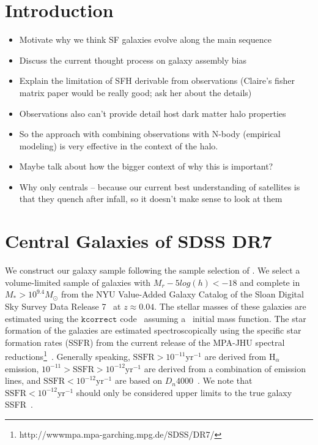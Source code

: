 \documentclass[12pt, letterpaper, preprint]{aastex}
\newcommand{\bitem}{\begin{itemize}}
\newcommand{\eitem}{\end{itemize}}
\begin{document}
\section{Introduction}
\bitem 
\item Motivate why we think SF galaxies evolve along the main sequence  
\item Discuss the current thought process on galaxy assembly bias 
\item Explain the limitation of SFH derivable from observations (Claire's fisher matrix paper would be really good; ask her about the details) 
\item Observations also can't provide detail host dark matter halo properties
\item So the approach with combining observations with N-body (empirical modeling) is very effective in the context of the halo.
\item Maybe talk about how the bigger context of why this is important?  
\item Why only centrals -- because our current best understanding of satellites is that they quench after infall, so it doesn't make sense to look at them
\eitem 

\section{Central Galaxies of SDSS DR7}
We construct our galaxy sample following the sample selection of \cite{tinker2011}. 
We select a volume-limited sample of galaxies with $M_r −5 log(h) < −18$ and complete in
$M_* > 10^{9.4} M_\odot$ from the NYU Value-Added Galaxy Catalog \citep[VAGC;][]{blanton2005}
of the Sloan Digital Sky Survey Data Release 7~\citep[SDSS DR7;][]{abazajian2009} at 
$z \approx 0.04$. The stellar masses of these galaxies are estimated using the
$\mathtt{kcorrect}$ code~\citep{blanton2007} assuming a~\cite{chabrier2003} initial
mass function. The star formation of the galaxies are estimated spectroscopically using the
specific star formation rates (SSFR) from the current release of the MPA-JHU spectral 
reductions\footnote{http://wwwmpa.mpa-garching.mpg.de/SDSS/DR7/}~\citep{brinchmann2004}.
Generally speaking, $\mathrm{SSFR} > 10^{-11}\mathrm{yr}^{-1}$ are derived from 
$\mathrm{H}_\alpha$ emission, $10^{-11} > \mathrm{SSFR} > 10^{-12}\mathrm{yr}^{-1}$
are derived from a combination of emission lines, and $\mathrm{SSFR} < 10^{-12}\mathrm{yr}^{-1}$
are based on $D_n 4000$~\citep[see discussion in][]{wetzel2013}. We note that 
$\mathrm{SSFR} < 10^{-12}\mathrm{yr}^{-1}$ should only be considered upper limits 
to the true galaxy SSFR~\citep{salim2007}.
\end{document}
